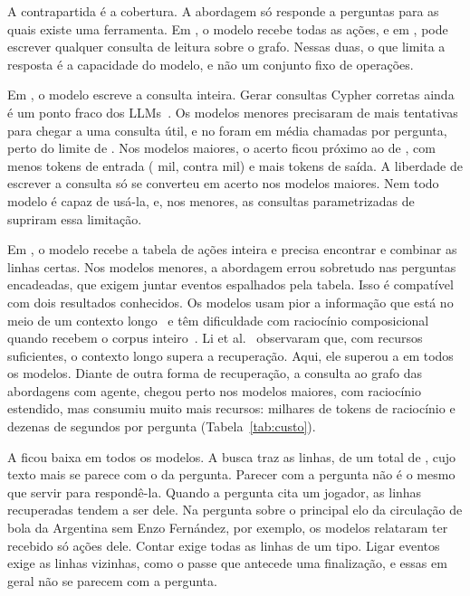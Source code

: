 A contrapartida é a cobertura. A abordagem \armGraphTools{} só responde a perguntas para as quais existe uma
ferramenta. Em \armEventsInPrompt{}, o modelo recebe todas as ações, e em \armTextToCypher{}, pode escrever
qualquer consulta de leitura sobre o grafo. Nessas duas, o que limita a resposta é a capacidade do modelo, e não um
conjunto fixo de operações.

Em \armTextToCypher{}, o modelo escreve a consulta inteira. Gerar consultas Cypher corretas ainda é um ponto fraco
dos LLMs~\cite{ozsoy2025text2cypher}. Os modelos menores precisaram de mais tentativas para chegar a uma consulta
útil, e no \modelQwen{} foram em média \callsQwenTextToCypher{} chamadas por pergunta, perto do limite de
\nMaxCalls{}. Nos modelos maiores, o acerto ficou próximo ao de \armGraphTools{}, com menos tokens de entrada
(\inRangeHighTextToCypher{} mil, contra \inRangeHighGraphTools{} mil) e mais tokens de saída. A liberdade de
escrever a consulta só se converteu em acerto nos modelos maiores. Nem todo modelo é capaz de usá-la, e, nos
menores, as consultas parametrizadas de \armGraphTools{} supriram essa limitação.

Em \armEventsInPrompt{}, o modelo recebe a tabela de ações inteira e precisa encontrar e combinar as linhas certas.
Nos modelos menores, a abordagem errou sobretudo nas perguntas encadeadas, que exigem juntar eventos espalhados
pela tabela. Isso é compatível com dois resultados conhecidos. Os modelos usam pior a informação que está no meio
de um contexto longo~\cite{liu2024lostinthemiddle} e têm dificuldade com raciocínio composicional quando recebem o
corpus inteiro~\cite{lee2024loft}. Li et al.~\cite{li2024ragorlongcontext} observaram que, com recursos
suficientes, o contexto longo supera a recuperação. Aqui, ele superou a \armVector{} em todos os modelos. Diante de
outra forma de recuperação, a consulta ao grafo das abordagens com agente, chegou perto nos modelos maiores, com
raciocínio estendido, mas consumiu muito mais recursos: milhares de tokens de raciocínio e dezenas de segundos por
pergunta (Tabela~\ref{tab:custo}).

A \armVector{} ficou baixa em todos os modelos. A busca traz as \nTopK{} linhas, de um total de \nActions{}, cujo
texto mais se parece com o da pergunta. Parecer com a pergunta não é o mesmo que servir para respondê-la. Quando a
pergunta cita um jogador, as linhas recuperadas tendem a ser dele. Na pergunta sobre o principal elo da circulação
de bola da Argentina sem Enzo Fernández, por exemplo, os modelos relataram ter recebido só ações dele. Contar exige
todas as linhas de um tipo. Ligar eventos exige as linhas vizinhas, como o passe que antecede uma finalização, e
essas em geral não se parecem com a pergunta.

